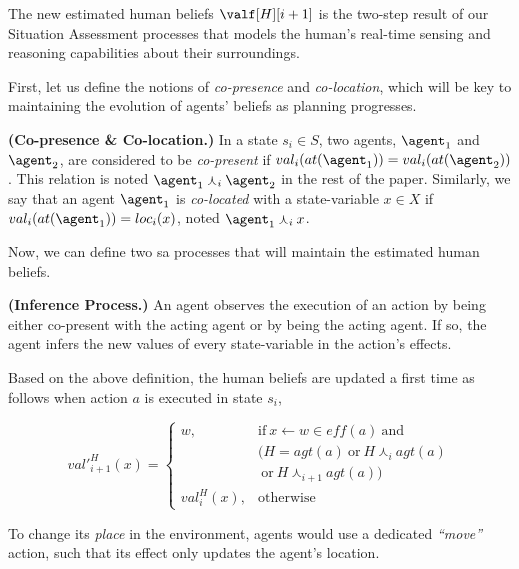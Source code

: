 {The new estimated human beliefs $\valf[H][i+1]$ is the two-step result of our Situation Assessment processes that models the human's real-time sensing and reasoning capabilities about their surroundings.

First, let us define the notions of \textit{co-presence} and \textit{co-location}, which will be key to maintaining the evolution of agents' beliefs as planning progresses.

\begin{definition} \label{def:co-pre-loc}
    \textbf{(Co-presence \& Co-location.)} In a state $s_i \in S$, two agents, $\agent_1$ and $\agent_2$, are considered to be \textit{co-present} if $val_i(at(\agent_1)) = val_i(at(\agent_2))$. This relation is noted $\agent_1 \curlywedge_i \agent_2$ in the rest of the paper. Similarly, we say that an agent $\agent_1$ is \textit{co-located} with a state-variable $x \in X$ if $val_i(at(\agent_1)) = loc_i(x)$, noted $\agent_1 \curlywedge_i x$.
\end{definition}

Now, we can define two \acrfull{sa} processes that will maintain the estimated human beliefs.

\begin{definition} \label{def:inference_process}
    \textbf{(Inference Process.)} An agent observes the execution of an action by being either co-present with the acting agent 
    or by being the acting agent. If so, the agent infers the new values of every state-variable in the action's effects.
\end{definition}

Based on the above definition, the human beliefs are updated a first time as follows when action $a$ is executed in state $s_i$, 

\begin{equation} \label{eq:apply_action_h}
val'^H_{i+1}(x) = \left\{ 
\begin{array}{ll}
    w, & \mbox{if} ~ x \leftarrow w \in \textit{eff}(a) ~ \mbox{and}  \\ 
    & (H = \textit{agt}(a) ~\mbox{or}~ H \curlywedge_i \textit{agt}(a)\\
    & ~\mbox{or}~ H \curlywedge_{i+1} \textit{agt}(a))\\
    val^H_i(x), & \mbox{otherwise}
\end{array}\right.
\end{equation}

To change its \textit{place} in the environment, agents would use a dedicated \textit{``move''} action, such that its effect only updates the agent's location. 

}
